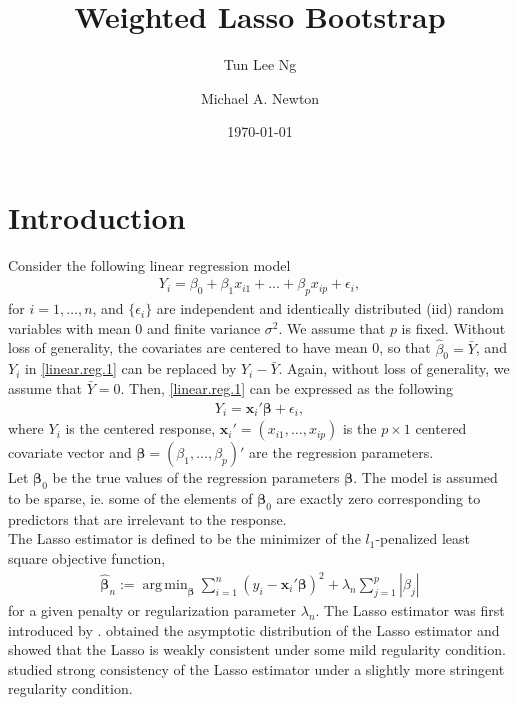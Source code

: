 \documentclass[12pt]{article}
\DeclareMathOperator*{\argmin}{arg\,min} %
\newcommand{\be}{\bm{\beta}} %
\newcommand{\sumin}{\sum_{i=1}^n} %
\newcommand{\x}{\bm{x}_i} %
\begin{document}
\title{Weighted Lasso Bootstrap}
\author{
	Tun Lee Ng
	\and
	Michael A. Newton
}\date{\today}
\maketitle

\section{Introduction}

Consider the following linear regression model 
	\begin{align} \label{linear.reg.1}
	Y_i = \beta_0 + \beta_1 x_{i1} + \ldots + \beta_p x_{ip} + \epsilon_i,  
	\end{align}
\noindent for $i = 1, \ldots, n$, and $\{\epsilon_i\}$ are independent and identically distributed (iid) random variables with mean 0 and finite variance $\sigma^2$. We assume that $p$ is fixed. Without loss of generality, the covariates are centered to have mean 0, so that $\hat{\beta}_0 = \bar{Y}$, and $Y_i$ in \eqref{linear.reg.1} can be replaced by $Y_i - \bar{Y}$. Again, without loss of generality, we assume that $\bar{Y} = 0$. Then, \eqref{linear.reg.1} can be expressed as the following         
	\begin{align} \label{linear.reg.2}
	Y_i = \x' \be + \epsilon_i,  
	\end{align}
\noindent where $Y_i$ is the centered response, $\x' = (x_{i1}, \ldots, x_{ip})$ is the $p \times 1$  centered covariate vector and $\be = (\beta_1, \ldots, \beta_p)'$ are the regression parameters. \\

Let $\be_0$ be the true values of the regression parameters $\be$. The model is assumed to be sparse, ie. some of the elements of $\be_0$ are exactly zero corresponding to predictors that are irrelevant to the response. \\  

The Lasso estimator is defined to be the minimizer of the $l_1$-penalized least square objective function,
	\begin{align} \label{lasso.obj}   
	\widehat{\be}_n 
	:= \argmin_{\be} 
		\sumin ( y_i - \x' \be )^2 
		+ \lambda_n \sum_{j=1}^p |\beta_j|
	\end{align}
\noindent for a given penalty or regularization parameter $\lambda_n$. The Lasso estimator was first introduced by \citet{Lasso}. \citet{Knight&Fu} obtained the asymptotic distribution of the Lasso estimator and showed that the Lasso is weakly consistent under some mild regularity condition. \citet{Chatterjee&Lahiri} studied strong consistency of the Lasso estimator under a slightly more stringent regularity condition. \\
\end{document}
